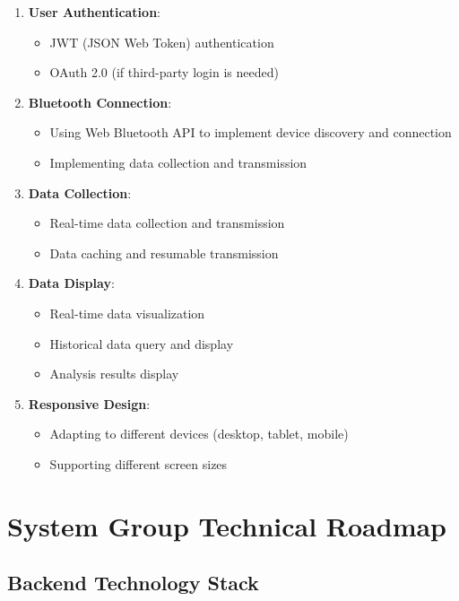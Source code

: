 \documentclass[a4paper,12pt]{article}
\begin{document}
\begin{enumerate}
  \item \textbf{User Authentication}:
    \begin{itemize}
      \item JWT (JSON Web Token) authentication
      \item OAuth 2.0 (if third-party login is needed)
    \end{itemize}
  
  \item \textbf{Bluetooth Connection}:
    \begin{itemize}
      \item Using Web Bluetooth API to implement device discovery and connection
      \item Implementing data collection and transmission
    \end{itemize}
  
  \item \textbf{Data Collection}:
    \begin{itemize}
      \item Real-time data collection and transmission
      \item Data caching and resumable transmission
    \end{itemize}
  
  \item \textbf{Data Display}:
    \begin{itemize}
      \item Real-time data visualization
      \item Historical data query and display
      \item Analysis results display
    \end{itemize}
  
  \item \textbf{Responsive Design}:
    \begin{itemize}
      \item Adapting to different devices (desktop, tablet, mobile)
      \item Supporting different screen sizes
    \end{itemize}
\end{enumerate}

\section{System Group Technical Roadmap}

\subsection{Backend Technology Stack}
\end{document}
